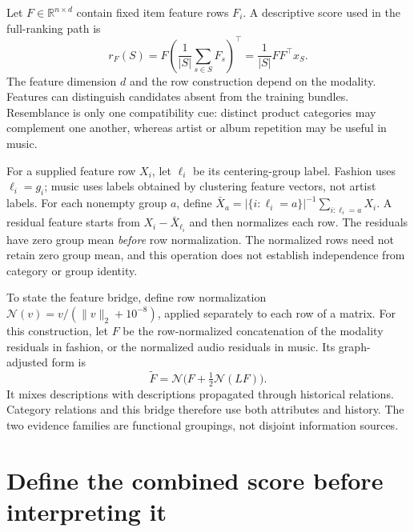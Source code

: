 \documentclass[11pt,a4paper]{article}
\begin{document}
Let $F\in\mathbb R^{n\times d}$ contain fixed item feature rows $F_i$. A descriptive
score used in the full-ranking path is
\begin{equation}\label{feature}
 r_F(S)=F\left(\frac{1}{|S|}\sum_{s\in S}F_s\right)^\top
       =\frac{1}{|S|}FF^\top x_S.
\end{equation}
The feature dimension $d$ and the row construction depend on the modality. Features
can distinguish candidates absent from the training bundles. Resemblance is only
one compatibility cue: distinct product categories may complement one another,
whereas artist or album repetition may be useful in music.

For a supplied feature row $X_i$, let $\ell_i$ be its centering-group label.
Fashion uses $\ell_i=g_i$; music uses labels obtained by clustering feature vectors,
not artist labels. For each nonempty group $a$, define
$\bar X_a=|\{i:\ell_i=a\}|^{-1}\sum_{i:\ell_i=a}X_i$.
A residual feature starts from $X_i-\bar X_{\ell_i}$ and then normalizes each row.
The residuals have zero group mean \emph{before} row normalization. The normalized
rows need not retain zero group mean, and this operation does not establish
independence from category or group identity.

To state the feature bridge, define row normalization
$\mathcal N(v)=v/(\lVert v\rVert_2+10^{-8})$, applied separately to each row of a
matrix. For this construction, let $F$ be the row-normalized concatenation of the
modality residuals in fashion, or the normalized audio residuals in music.
Its graph-adjusted form is
\begin{equation}
 \widetilde F=\mathcal N\bigl(F+\tfrac12\mathcal N(LF)\bigr).
\end{equation}
It mixes descriptions with descriptions propagated through historical relations.
Category relations and this bridge therefore use both attributes and history. The
two evidence families are functional groupings, not disjoint information sources.

\section{Define the combined score before interpreting it}
\end{document}
